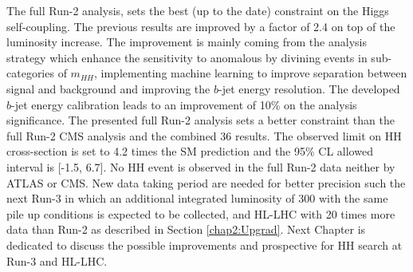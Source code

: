 The full Run-2 \HHyybb analysis, sets the best (up to the date) constraint on the Higgs self-coupling. The previous results are improved by a factor of 2.4 on top of the luminosity increase. The improvement is mainly coming from the analysis strategy which enhance the sensitivity to \kl anomalous by divining events in sub-categories of $m_{HH}$, implementing machine learning to improve separation between signal and background and improving the $b$-jet energy resolution. The developed $b$-jet energy calibration leads to an improvement of 10\% on the analysis significance. The presented full Run-2 \HHyybb analysis sets a better constraint than the full Run-2 CMS analysis and the combined 36 \ifb results. The observed limit on HH cross-section is set to 4.2 times the SM prediction and the 95\% CL allowed \kl interval is [-1.5, 6.7]. No HH event is observed in the full Run-2 data neither by ATLAS or CMS. New data taking period are needed for better precision such the next Run-3 in which an additional integrated luminosity of 300 \ifb with the same pile up conditions is expected to be collected, and HL-LHC with 20 times more data than Run-2 as described in Section \ref{chap2:Upgrad}. Next Chapter is dedicated to discuss the possible improvements and prospective for HH search at Run-3 and HL-LHC. 